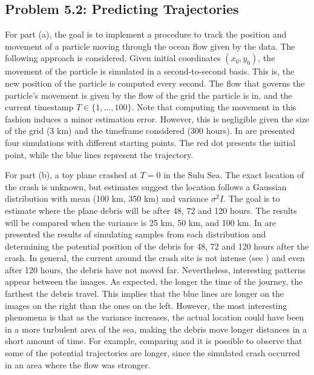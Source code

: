 \documentclass[11pt, english]{article}
\begin{document}
\begin{multicols}{2}
\section*{Problem 5.2: Predicting Trajectories}

For part (a), the goal is to implement a procedure to track the position and movement of a particle moving through the ocean flow given by the data. The following approach is considered. Given initial coordinates $(x_0, y_0)$, the movement of the particle is simulated in a second-to-second basis. This is, the new position of the particle is computed every second. The flow that governs the particle's movement is given by the flow of the grid the particle is in, and the current timestamp $T \in \{1, \ldots, 100\}$. Note that computing the movement in this fashion induces a minor estimation error. However, this is negligible given the size of the grid (3 km) and the timeframe considered (300 hours). In  are presented four simulations with different starting points. The red dot presents the initial point, while the blue lines represent the trajectory.

For part (b), a toy plane crashed at $T=0$ in the Sulu Sea. The exact location of the crash is unknown, but estimates suggest the location follows a Gaussian distribution with mean (100 km, 350 km) and variance $\sigma^2 I$. The goal is to estimate where the plane debris will be after 48, 72 and 120 hours. The results will be compared when the variance is 25 km, 50 km, and 100 km. In  are presented the results of simulating samples from each distribution and determining the potential position of the debris for 48, 72 and 120 hours after the crash. In general, the current around the crash site is not intense (see ) and even after 120 hours, the debris have not moved far. Nevertheless, interesting patterns appear between the images. As expected, the longer the time of the journey, the farthest the debris travel. This implies that the blue lines are longer on the images on the right than the ones on the left. However, the most interesting phenomena is that as the variance increases, the actual location could have been in a more turbulent area of the sea, making the debris move longer distances in a short amount of time. For example, comparing  and  it is possible to observe that some of the potential trajectories are longer, since the simulated crash occurred in an area where the flow was stronger. 



\end{multicols}
\end{document}
